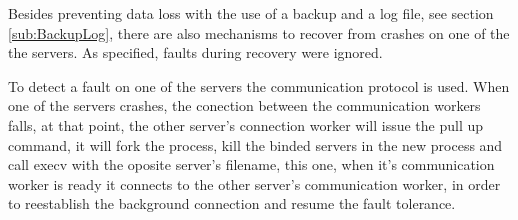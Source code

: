 \documentclass[12pt]{article} %
\begin{document}
Besides preventing data loss with the use of a backup and a log file, see section \ref{sub:BackupLog}, 
there are also mechanisms to recover from crashes on one of the the servers. 
As specified, faults during recovery were ignored.

To detect a fault on one of the servers the communication protocol is used. 
When one of the servers crashes, the conection between the communication 
workers falls, at that point, the other server's connection worker will issue the pull 
up command, it will fork the process, kill the binded servers in the new process and 
call execv with the oposite server's filename, this one, when it's communication 
worker is ready it connects to the other server's communication worker, in order 
to reestablish the background connection and resume the fault tolerance.

\end{document}
